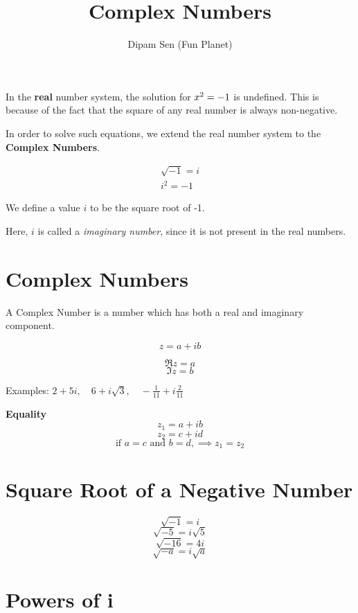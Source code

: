 \documentclass[
  14pt,
]{extarticle}
\title{\textbf{Complex Numbers}}
\author{Dipam Sen (Fun Planet)}
\date{}
\renewenvironment{quote}{\begin{myquote}}{\end{myquote}}
\begin{document}
\maketitle
\thispagestyle{fancy}

In the \textbf{real} number system, the solution for
\(\gdef\Re{\mathrm{Re}\ }\gdef\Im{\mathrm{Im}\ }x^2=-1\) is undefined.
This is because of the fact that the square of any real number is always
non-negative.

In order to solve such equations, we extend the real number system to
the \textbf{Complex Numbers}.

\[
\boxed{
    \begin{aligned}
    \sqrt{-1}=i\\
i^2=-1\end{aligned}}
\]

We define a value \(i\) to be the square root of -1.

\begin{quote}
Here, \(i\) is called a \emph{imaginary number}, since it is not present
in the real numbers.
\end{quote}

\hypertarget{complex-numbers-1}{%
\section{Complex Numbers}\label{complex-numbers-1}}

A Complex Number is a number which has both a real and imaginary
component.

\[z = a+ib \tag{$a\in R, b\in R$}\]

\[\Re z=a\] \[\Im z=b\]

Examples:
\(\displaystyle 2+5i,\quad 6+i\sqrt3,\quad -\frac1{11}+i\frac2{11}\)

\begin{quote}
\textbf{Equality} \[z_1=a+ib\] \[z_2=c+id\]
\[\text{if }a=c\text{ and }b=d, \implies z_1=z_2\]
\end{quote}

\hypertarget{square-root-of-a-negative-number}{%
\section{Square Root of a Negative
Number}\label{square-root-of-a-negative-number}}

\[\sqrt{-1}= i\] \[\sqrt{-5}= i\sqrt{5}\] \[\sqrt{-16}= 4i\]
\[\sqrt{-a}= i\sqrt a\]

\hypertarget{powers-of-i}{%
\section{Powers of i}\label{powers-of-i}}
\end{document}
